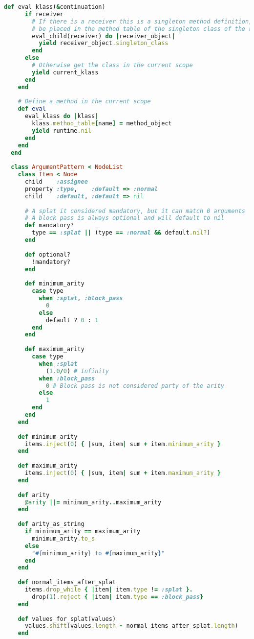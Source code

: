 \begin{lstlisting}[title={\small\Helvetica ast/scopes.rb},language=Ruby]
    def eval_klass(&continuation)
      if receiver
        # If there is a receiver this is a singleton method definition, so the method should
        # be placed in the method table of the singleton class of the receiver
        eval_child(receiver) do |receiver_object|
          yield receiver_object.singleton_class
        end
      else
        # Otherwise get the class in the current scope
        yield current_klass
      end
    end
    
    # Define a method in the current scope
    def eval
      eval_klass do |klass|
        klass.method_table[name] = method_object
        yield runtime.nil
      end
    end
  end
  
  class ArgumentPattern < NodeList
    class Item < Node
      child    :assignee
      property :type,    :default => :normal
      child    :default, :default => nil
      
      # A splat it considered mandatory, but it can match 0 arguments
      # A block pass is always optional and will default to nil
      def mandatory?
        type == :splat || (type == :normal && default.nil?)
      end
      
      def optional?
        !mandatory?
      end
      
      def minimum_arity
        case type
          when :splat, :block_pass
            0
          else
            default ? 0 : 1
        end
      end
      
      def maximum_arity
        case type
          when :splat
            (1.0/0) # Infinity
          when :block_pass
            0 # Block pass is not considered party of the arity
          else
            1
        end
      end
    end
    
    def minimum_arity
      items.inject(0) { |sum, item| sum + item.minimum_arity }
    end
    
    def maximum_arity
      items.inject(0) { |sum, item| sum + item.maximum_arity }
    end
    
    def arity
      @arity ||= minimum_arity..maximum_arity
    end
    
    def arity_as_string
      if minimum_arity == maximum_arity
        minimum_arity.to_s
      else
        "#{minimum_arity} to #{maximum_arity}"
      end
    end
    
    def normal_items_after_splat
      items.drop_while { |item| item.type != :splat }.
        drop(1).reject { |item| item.type == :block_pass}
    end
    
    def values_for_splat(values)
      values.shift(values.length - normal_items_after_splat.length)
    end
    

\end{lstlisting}
